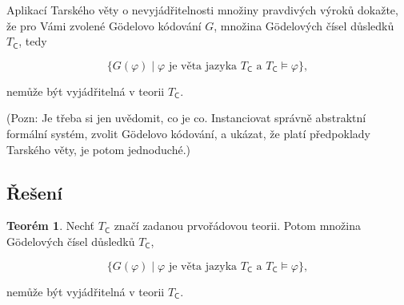 \documentclass[a4paper, 12pt]{article}
\theoremstyle{definition}
\theoremstyle{definition}
\newtheorem{theorem}{Teorém}[section]
\theoremstyle{definition}
\theoremstyle{remark}
\theoremstyle{remark}
\theoremstyle{remark}
\theoremstyle{remark}
\begin{document}
Aplikací Tarského věty o nevyjádřitelnosti množiny pravdivých výroků dokažte, že pro Vámi zvolené Gödelovo kódování $G$, množina Gödelových čísel důsledků $T_\mathsf{C}$, tedy

$$\{G(\varphi) \; | \; \varphi \text{ je věta jazyka } T_\mathsf{C} \text{ a } T_\mathsf{C} \models \varphi\},$$

\noindent
nemůže být vyjádřitelná v teorii $T_\mathsf{C}$.

\vspace{0.25cm}

\noindent
{\footnotesize (Pozn: Je třeba si jen uvědomit, co je co. Instanciovat správně abstraktní formální systém, zvolit Gödelovo kódování, a ukázat, že platí předpoklady Tarského věty, je potom jednoduché.)}

\subsection{Řešení}

\begin{theorem}
    Nechť $T_\mathsf{C}$ značí zadanou prvořádovou teorii. Potom množina Gödelových čísel důsledků $T_\mathsf{C}$,

    $$\{G(\varphi) \; | \; \varphi \text{ je věta jazyka } T_\mathsf{C} \text{ a } T_\mathsf{C} \models \varphi\},$$

    \noindent
    nemůže být vyjádřitelná v teorii $T_\mathsf{C}$.
\end{theorem}
\end{document}
